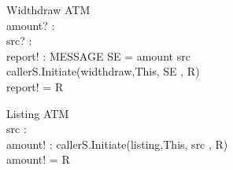 \begin{schema}{Widthdraw}
\Delta ATM \\ 
amount? : \nat  \\ 
src? : \nat \\
report! : MESSAGE 
\where
SE = \lseq amount src  \rseq \\
callerS.Initiate(widthdraw,This,  SE  , R) \\
report! = R 
\end{schema}

\begin{schema}{Listing}
\Xi ATM \\ 
src : \nat \\ 
amount! : \nat   
\where
callerS.Initiate(listing,This,  src  , R) \\
amount! = R 
\end{schema}



